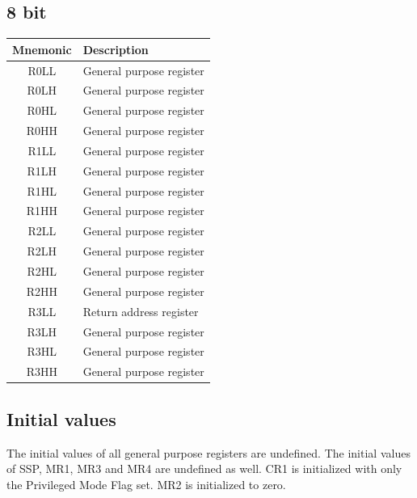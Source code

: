 \subsection{8 bit}

\begin{tabular}{ | c | l | }
	\hline                        
	\textbf{Mnemonic} & \textbf{Description} \\
	\hline
	R0LL & General purpose register \\
	\hline
	R0LH & General purpose register \\
	\hline
	R0HL & General purpose register \\
	\hline
	R0HH & General purpose register \\
	\hline
	R1LL & General purpose register \\
	\hline
	R1LH & General purpose register \\
	\hline
	R1HL & General purpose register \\
	\hline
	R1HH & General purpose register \\
	\hline
	R2LL & General purpose register \\
	\hline
	R2LH & General purpose register \\
	\hline
	R2HL & General purpose register \\
	\hline
	R2HH & General purpose register \\
	\hline
	R3LL & Return address register \\
	\hline
	R3LH & General purpose register \\
	\hline
	R3HL & General purpose register \\
	\hline
	R3HH & General purpose register \\
	\hline
\end{tabular}

\subsection{Initial values}

The initial values of all general purpose registers are undefined. The initial values of SSP, MR1, MR3 and MR4 are undefined as well.
CR1 is initialized with only the Privileged Mode Flag set. MR2 is initialized to zero. 
